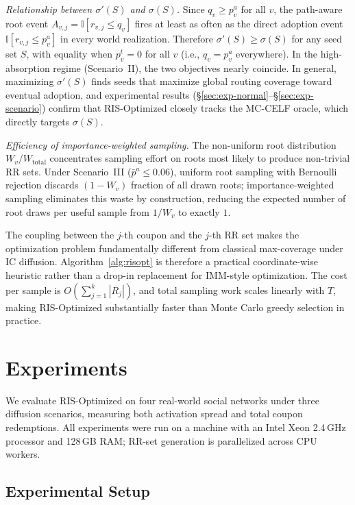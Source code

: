 \documentclass[sigconf]{acmart}
\begin{document}
\textit{Relationship between $\sigma'(S)$ and $\sigma(S)$.} Since $q_v \geq p_v^a$ for all $v$, the path-aware root event $A_{v,j} = \mathbb{I}[r_{v,j} \leq q_v]$ fires at least as often as the direct adoption event $\mathbb{I}[r_{v,j} \leq p_v^a]$ in every world realization. Therefore $\sigma'(S) \geq \sigma(S)$ for any seed set $S$, with equality when $p_v^t = 0$ for all $v$ (i.e., $q_v = p_v^a$ everywhere). In the high-absorption regime (Scenario~II), the two objectives nearly coincide. In general, maximizing $\sigma'(S)$ finds seeds that maximize global routing coverage toward eventual adoption, and experimental results (\S\ref{sec:exp-normal}--\S\ref{sec:exp-scenario}) confirm that RIS-Optimized closely tracks the MC-CELF oracle, which directly targets $\sigma(S)$.

\textit{Efficiency of importance-weighted sampling.} The non-uniform root distribution $W_v / W_{\mathrm{total}}$ concentrates sampling effort on roots most likely to produce non-trivial RR sets. Under Scenario~III ($\bar{p}^a \leq 0.06$), uniform root sampling with Bernoulli rejection discards $(1 - W_v)$ fraction of all drawn roots; importance-weighted sampling eliminates this waste by construction, reducing the expected number of root draws per useful sample from $1/W_v$ to exactly $1$.

The coupling between the $j$-th coupon and the $j$-th RR set makes the optimization problem fundamentally different from classical max-coverage under IC diffusion. Algorithm~\ref{alg:risopt} is therefore a practical coordinate-wise heuristic rather than a drop-in replacement for IMM-style optimization. The cost per sample is $O(\sum_{j=1}^{k} |R_j|)$, and total sampling work scales linearly with $T$, making RIS-Optimized substantially faster than Monte Carlo greedy selection in practice.

\section{Experiments}

We evaluate RIS-Optimized on four real-world social networks under three diffusion scenarios, measuring both activation spread and total coupon redemptions. All experiments were run on a machine with an Intel Xeon 2.4\,GHz processor and 128\,GB RAM; RR-set generation is parallelized across CPU workers.

\subsection{Experimental Setup}
\label{sec:exp-setup}
\end{document}
